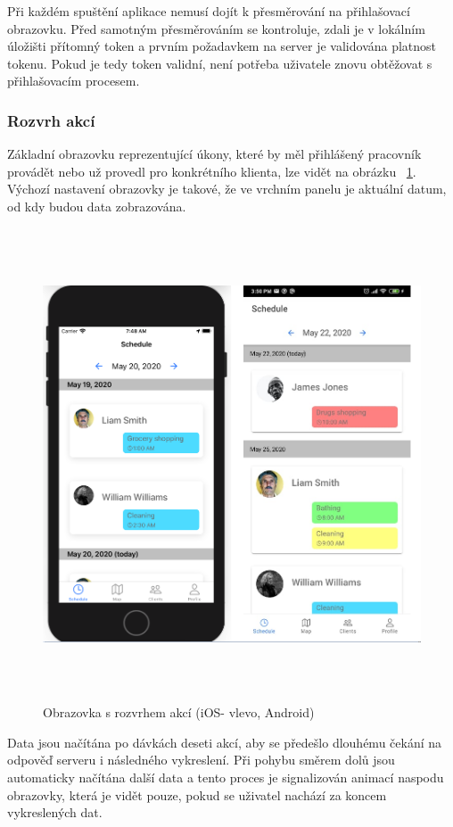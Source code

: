 \documentclass[
  glossaries,
]{kidiplom}
\begin{document}
Při každém spuštění aplikace nemusí dojít k přesměrování na přihlašovací obrazovku. Před samotným přesměrováním se kontroluje, zdali je v lokálním úložišti přítomný token a prvním požadavkem na server je validována platnost tokenu. Pokud je tedy token validní, není potřeba uživatele znovu obtěžovat s přihlašovacím procesem.

\subsubsection{Rozvrh akcí}
\label{sec:schedule}
Základní obrazovku reprezentující úkony, které by měl přihlášený pracovník provádět nebo už provedl pro konkrétního klienta, lze vidět na obrázku ~\ref{fig:schedule_screen}. Výchozí nastavení obrazovky je takové, že ve vrchním panelu je aktuální datum, od kdy budou data zobrazována. 

\begin{figure}[H]
  	\centering
 	 \includegraphics[width=14cm,height=14cm,keepaspectratio]{schedule_screen}
 	 \caption{Obrazovka s rozvrhem akcí (iOS- vlevo, Android)}
 	 \label{fig:schedule_screen}
\end{figure}

Data jsou načítána po dávkách deseti akcí, aby se předešlo dlouhému čekání na odpověď serveru i následného vykreslení. Při pohybu směrem dolů jsou automaticky načítána další data a tento proces je signalizován animací naspodu obrazovky, která je vidět pouze, pokud se uživatel nachází za koncem vykreslených dat.
\end{document}
